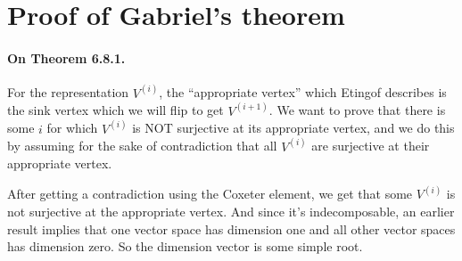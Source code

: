 \documentclass[oneside]{scrbook}
\begin{document}
\section{Proof of Gabriel's theorem}
\paragraph{On Theorem 6.8.1.}
For the representation $V^{(i)}$, the ``appropriate vertex'' which Etingof describes is the sink vertex which we will flip to get $V^{(i+1)}$. We want to prove that there is some $i$ for which $V^{(i)}$ is NOT surjective at its appropriate vertex, and we do this by assuming for the sake of contradiction that all $V^{(i)}$ are surjective at their appropriate vertex.

After getting a contradiction using the Coxeter element, we get that some $V^{(i)}$ is not surjective at the appropriate vertex. And since it's indecomposable, an earlier result implies that one vector space has dimension one and all other vector spaces has dimension zero. So the dimension vector is some simple root. 



\newpage

\nocite{*}


\end{document}
